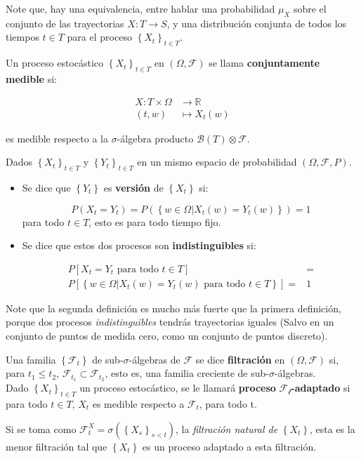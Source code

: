 Note que, hay una equivalencia, entre hablar una probabilidad $\mu_X$ sobre el conjunto de las trayectorias $X: T \rightarrow S$, y una distribución conjunta de todos los tiempos $t \in T$ para el proceso $\left\{ X_t \right\}_{t \in T}$.

\begin{boxDef}
	Un proceso estocástico $\left\{ X_t \right\}_{t \in T}$ en $(\Omega, \mathcal{F})$ se llama \textbf{conjuntamente medible} si:

	\begin{align*}
		X: T \times \Omega &\rightarrow \mathbb{R} \\
		(t, w) &\mapsto X_t (w)
	\end{align*}

	es medible respecto a la $\sigma$-álgebra producto $\mathcal{B}(T) \otimes \mathcal{F}.$

\end{boxDef}

\begin{boxDef}
	Dados $\left\{ X_t \right\}_{t \in T}$ y $\left\{ Y_t \right\}_{t \in T}$ en un mismo espacio de probabilidad $(\Omega, \mathcal{F}, P)$.

	\begin{itemize}
		\item Se dice que $\left\{ Y_t \right\}$ es \textbf{versión} de $\left\{ X_t \right\}$ si:

		\[
			P( X_t = Y_t ) = P( \left\{ w \in \Omega \vert X_t (w) = Y_t(w) \right\}) = 1
		\]
		para todo $t \in T$, esto es para todo tiempo fijo.

		\item Se dice que estos dos procesos son \textbf{indistinguibles} si:

		\begin{align*}
			P[X_t = Y_t \text{ para todo } t \in T] &= \\ 
			P[\left\{ w \in \Omega \vert X_t (w) = Y_t (w) \text{ para todo } t \in T \right\}] =& 1
		\end{align*}
	\end{itemize}


\end{boxDef}

Note que la segunda definición es mucho más fuerte que la primera definición, porque dos procesos \textit{indistinguibles} tendrás trayectorias iguales (Salvo en un conjunto de puntos de medida cero, como un conjunto de puntos discreto).

\begin{boxDef}
	Una familia $\left\{ \mathcal{F}_t \right\}$ de sub-$\sigma$-álgebras de $\mathcal{F}$ se dice \textbf{filtración} en $(\Omega, \mathcal{F})$ si, para $t_1 \leq t_2$, $\mathcal{F}_{t_1} \subset \mathcal{F}_{t_2}$, esto es, una familia creciente de sub-$\sigma$-álgebras.\\

	Dado $\left\{ X_t \right\}_{t \in T}$ un proceso estocástico, se le llamará \textbf{proceso} $\mathcal{F_t}$\textbf{-adaptado} si para todo $t \in T$, $X_t$ es medible respecto a $\mathcal{F}_t$, para todo t.
\end{boxDef}

Si se toma como $\mathcal{F}_{t}^{X} = \sigma (\left\{ X_s \right\}_{s < t})$, la \textit{filtración natural de} $\left\{ X_t \right\}$, esta es la menor filtración tal que $\left\{X_t\right\}$ es un proceso adaptado a esta filtración.